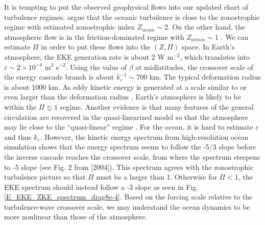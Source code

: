 \documentclass{ametsoc}
\begin{document}
It is tempting to put the observed geophysical flows into our updated
chart of turbulence regimes. \citet{Galperin2004} argue that the
oceanic turbulence is close to the zonostrophic regime with estimated
zonostrophic index $Z_{ocean}\sim2$. On the other hand, the atmospheric
flow is in the friction-dominated regime with $Z_{atmos}\sim1$ \citep{Galperin2010}.
We can estimate $\Pi$ in order to put these flows into the $(Z,\Pi)$
space. In Earth's atmosphere, the EKE generation rate is about
2 W m$^{-2}$, which translates into $\varepsilon\sim2\times10^{-4}$
m$^{2}$ s$^{-2}$. Using the value of $\beta$ at midlatitudes, the
crossover scale of the energy cascade branch is about $k_{\varepsilon}^{-1}\sim700$
km. The typical deformation radius is about 1000 km. As eddy kinetic
energy is generated at a scale similar to or even larger than the deformation
radius \citep{Chai2014}, Earth's atmosphere is likely to be within
the $\Pi\apprle1$ regime. Another evidence is that many features
of the general circulation are recovered in the quasi-linearized model
so that the atmosphere may lie close to the ``quasi-linear'' regime
\citep{O'Gorman2007}. For the ocean, it is hard to estimate $\varepsilon$
and thus $k_{\varepsilon}$. However, the kinetic energy spectrum
from high-resolution ocean simulation shows that the energy spectrum
seems to follow the -5/3 slope before the inverse cascade reaches
the crossover scale, from where the spectrum steepens to -5 slope
(see Fig. 2 from \citeauthor{Galperin2004} {[}2004{]}). This spectrum
agrees with the zonostrophic turbulence picture so that $\Pi$ must
be a larger than 1. Otherwise for $\Pi<1$, the EKE spectrum should
instead follow a -3 slope as seen in Fig. \ref{E_EKE_ZKE_spectrum_drag8e-4}.
Based on the forcing scale relative to the turbulence-wave crossover
scale, we may understand the ocean dynamics to be more nonlinear than
those of the atmosphere. 


 
 
\end{document}
